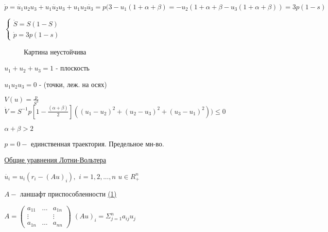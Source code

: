 \documentclass[oneside, final, 12pt]{article}
\begin{document}
\begin{large}
\vspace{0.5cm}
\(
\dot{p} = \dot{u_1}u_2u_3 + u_1\dot{u_2}u_3+u_1u_2\dot{u_3}=p(3-u_1(1+\alpha + \beta)=-u_2(1+\alpha+\beta - u_3(1+\alpha + \beta)) = 3p(1-s)
\)

\newpage
\(
	\begin{cases}
	\dot{S} = S(1-S)
	\\
	\dot{p} = 3p(1-s)
	\end{cases}
\)

\begin{figure} [h!]
			\caption{Картина неустойчива}	
\end{figure}

\vspace{0.5cm}
\(
u_1 + u_2 +u_3 = 1
\) - плоскость

\vspace{0.5cm}
\(
u_1u_2u_3 = 0
\) - (точки, леж. на осях)

\vspace{0.5cm}
\(
V(u) = \frac{p}{S^3}
\) \hspace{0.2cm}
\(
\dot{V} = S^{-1}p \left[ 1 - \frac{(\alpha + \beta)}{2} \right]((u_1 - u_2)^2 + (u_2-u_3)^2 +(u_3-u_1)^2))\leq 0
\)

\vspace{0.5cm}
\(
\alpha + \beta > 2
\)

\vspace{0.5cm}
\(
 p = 0 - 
\) единственная траектория. Предельное мн-во.

\vspace{0.5cm}
\underline{Общие уравнения Лотни-Вольтера}

\vspace{0.5cm}
\(
\dot{u_i} = u_i(r_i-(Au)_i) , 
\)\hspace{0.2cm}
\(
i = 1,2,...,n
\)
\hspace{0.2cm}
\(
u \in R_+^n
\)


\vspace{0.5cm}
\(
A - 
\) ланшафт приспособленности \underline{(1)}


\vspace{0.5cm}
\(
A = 
	\begin{pmatrix}
	a_11 & \ldots & a_{1n} \\
	\vdots & & \vdots \\
	a_{1n} & \ldots & a_{nn}
	\end{pmatrix}
\)\hspace{0.7cm}
\(
(Au)_i = \Sigma_{j=1}^n a_{ij}u_j
\)


\end{large}
\end{document}
